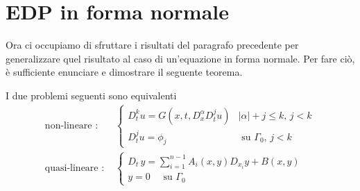 \newpage
\section{EDP in forma normale}
Ora ci occupiamo di sfruttare i risultati del paragrafo precedente per generalizzare quel risultato al caso di un'equazione in forma normale. Per fare ciò, è sufficiente enunciare e dimostrare il seguente teorema.
\begin{theorem}\label{teonorm}
I due problemi seguenti sono equivalenti
\begin{align*}
\text{non-lineare : }&
\begin{cases}
D_{t}^k u = G(x,t, D^\alpha_x D^j_t u) & |\alpha |+ j \leq k, \, j<k \\
D_t^ju = \phi_j & \text{ su } \Gamma_0, \, j<k
\end{cases} \\
\text{quasi-lineare : }&
\begin{cases}
D_t \, y = \sum\limits_{i=1}^{n-1} A_i(x,y)D_{x_i}y+B(x,y) \; \\
y=0 \quad \text{ su } \Gamma_0
\end{cases}
\end{align*}
\end{theorem}

